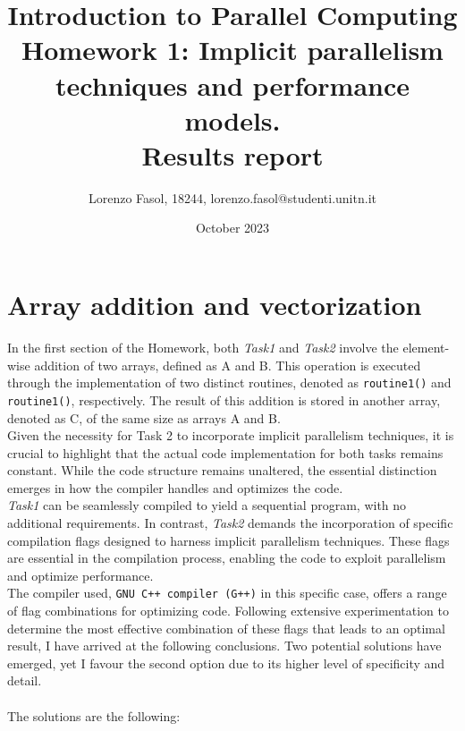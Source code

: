 \documentclass{article}
\begin{document}
\title{Introduction to Parallel Computing\\
    Homework 1: Implicit parallelism techniques and performance models.\\
    \textbf{Results report}
}
\author{Lorenzo Fasol, 18244, lorenzo.fasol@studenti.unitn.it}
\date{October 2023}
\maketitle

\section{Array addition and vectorization}
In the first section of the Homework, both \textit{Task1} and \textit{Task2} involve the element-wise addition of two arrays, defined as A and B. This operation is executed through the implementation of two distinct routines, denoted as \texttt{routine1()} and \texttt{routine1()}, respectively. The result of this addition is stored in another array, denoted as C, of the same size as arrays A and B.\\
Given the necessity for Task 2 to incorporate implicit parallelism techniques, it is crucial to highlight that the actual code implementation for both tasks remains constant. While the code structure remains unaltered, the essential distinction emerges in how the compiler handles and optimizes the code.\\
\textit{Task1} can be seamlessly compiled to yield a sequential program, with no additional requirements. In contrast, \textit{Task2} demands the incorporation of specific compilation flags designed to harness implicit parallelism techniques. These flags are essential in the compilation process, enabling the code to exploit parallelism and optimize performance.\\
The compiler used, \texttt{GNU C++ compiler (G++)} in this specific case, offers a range of flag combinations for optimizing code. Following extensive experimentation to determine the most effective combination of these flags that leads to an optimal result, I have arrived at the following conclusions. Two potential solutions have emerged, yet I favour the second option due to its higher level of specificity and detail.\\\\
The solutions are the following:
\end{document}
